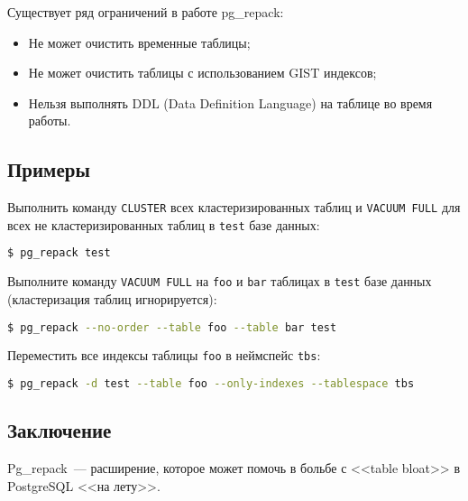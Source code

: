 Существует ряд ограничений в работе pg\_repack:

\begin{itemize}
  \item Не может очистить временные таблицы;
  \item Не может очистить таблицы с использованием GIST индексов;
  \item Нельзя выполнять DDL (Data Definition Language) на таблице во время работы.
\end{itemize}

\subsection{Примеры}

Выполнить команду \lstinline!CLUSTER! всех кластеризированных таблиц и \lstinline!VACUUM FULL! для всех не кластеризированных таблиц в \lstinline!test! базе данных:

\begin{lstlisting}[language=Bash,label=lst:pgrepack1]
$ pg_repack test
\end{lstlisting}

Выполните команду \lstinline!VACUUM FULL! на \lstinline!foo! и \lstinline!bar! таблицах в \lstinline!test! базе данных (кластеризация таблиц игнорируется):

\begin{lstlisting}[language=Bash,label=lst:pgrepack2]
$ pg_repack --no-order --table foo --table bar test
\end{lstlisting}

Переместить все индексы таблицы \lstinline!foo! в неймспейс \lstinline!tbs!:

\begin{lstlisting}[language=Bash,label=lst:pgrepack3]
$ pg_repack -d test --table foo --only-indexes --tablespace tbs
\end{lstlisting}

\subsection{Заключение}

Pg\_repack~--- расширение, которое может помочь в больбе с <<table bloat>> в PostgreSQL <<на лету>>.